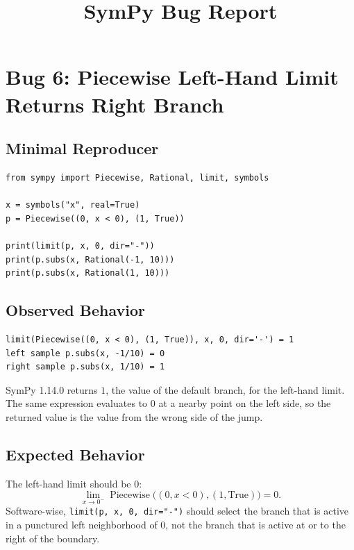 \documentclass[11pt]{article}
\title{SymPy Bug Report}
\author{}
\date{}
\begin{document}
\maketitle

\section{Bug 6: Piecewise Left-Hand Limit Returns Right Branch}

\subsection{Minimal Reproducer}

\medskip

\begin{lstlisting}[style=bugpython]
from sympy import Piecewise, Rational, limit, symbols

x = symbols("x", real=True)
p = Piecewise((0, x < 0), (1, True))

print(limit(p, x, 0, dir="-"))
print(p.subs(x, Rational(-1, 10)))
print(p.subs(x, Rational(1, 10)))
\end{lstlisting}

\subsection{Observed Behavior}

\medskip

\begin{lstlisting}[style=bugpython]
limit(Piecewise((0, x < 0), (1, True)), x, 0, dir='-') = 1
left sample p.subs(x, -1/10) = 0
right sample p.subs(x, 1/10) = 1
\end{lstlisting}

SymPy 1.14.0 returns \(1\), the value of the default branch, for the left-hand
limit.  The same expression evaluates to \(0\) at a nearby point on the left
side, so the returned value is the value from the wrong side of the jump.

\subsection{Expected Behavior}

The left-hand limit should be \(0\):
\[
  \lim_{x\to 0^-}
  \operatorname{Piecewise}\bigl((0,x<0),(1,\mathrm{True})\bigr)=0.
\]
Software-wise, \texttt{limit(p, x, 0, dir="-")} should select the branch that is
active in a punctured left neighborhood of \(0\), not the branch that is active
at or to the right of the boundary.
\end{document}
